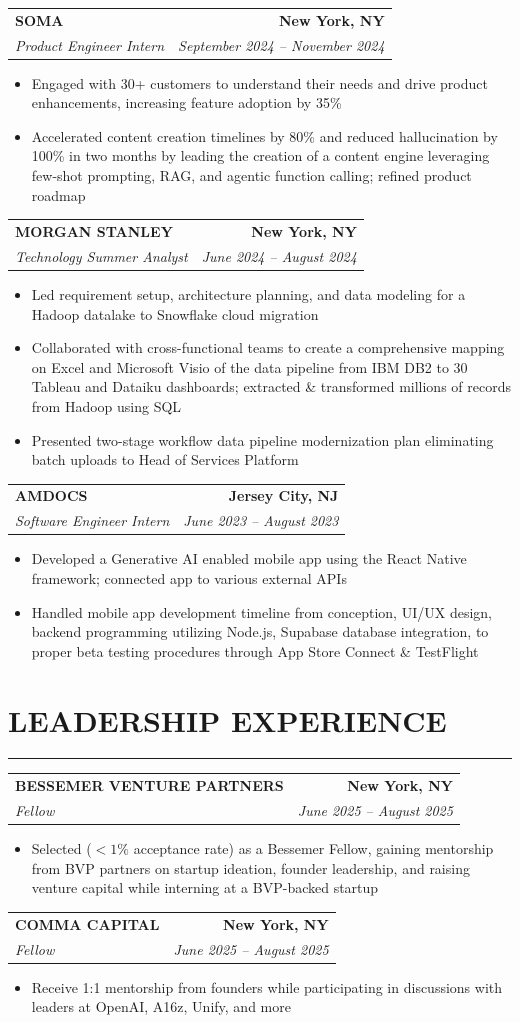 \documentclass[letterpaper,10pt]{article}
\makeatletter
\newcommand{\sectionline}{\vspace{1pt}\hrule\vspace{4pt}}
\newcommand{\resumeSubheading}[4]{%
  \vspace{2pt}
  \begin{tabular*}{\textwidth}{@{\extracolsep{\fill}} l r}
    \textbf{#1} & \textbf{#2} \\
    \textit{#3} & \textit{#4} \\
  \end{tabular*}
}
\newcommand{\resumeItem}[1]{\item #1}
\newcommand{\resumeItemListStart}{\begin{itemize}}
\newcommand{\resumeItemListEnd}{\end{itemize}}
\makeatother
\begin{document}
\resumeSubheading
  {SOMA}{New York, NY}
  {Product Engineer Intern}{September 2024 -- November 2024}
\resumeItemListStart
  \resumeItem{Engaged with 30+ customers to understand their needs and drive product enhancements, increasing feature adoption by 35\%}
  \resumeItem{Accelerated content creation timelines by 80\% and reduced hallucination by 100\% in two months by leading the creation of a content engine leveraging few-shot prompting, RAG, and agentic function calling; refined product roadmap}
\resumeItemListEnd

\resumeSubheading
  {MORGAN STANLEY}{New York, NY}
  {Technology Summer Analyst}{June 2024 -- August 2024}
\resumeItemListStart
  \resumeItem{Led requirement setup, architecture planning, and data modeling for a Hadoop datalake to Snowflake cloud migration}
  \resumeItem{Collaborated with cross-functional teams to create a comprehensive mapping on Excel and Microsoft Visio of the data pipeline from IBM DB2 to 30 Tableau and Dataiku dashboards; extracted \& transformed millions of records from Hadoop using SQL}
  \resumeItem{Presented two-stage workflow data pipeline modernization plan eliminating batch uploads to Head of Services Platform}
\resumeItemListEnd

\resumeSubheading
  {AMDOCS}{Jersey City, NJ}
  {Software Engineer Intern}{June 2023 -- August 2023}
\resumeItemListStart
  \resumeItem{Developed a Generative AI enabled mobile app using the React Native framework; connected app to various external APIs}
  \resumeItem{Handled mobile app development timeline from conception, UI/UX design, backend programming utilizing Node.js, Supabase database integration, to proper beta testing procedures through App Store Connect \& TestFlight}
\resumeItemListEnd

\section*{LEADERSHIP EXPERIENCE}
\sectionline
\resumeSubheading
  {BESSEMER VENTURE PARTNERS}{New York, NY}
  {Fellow}{June 2025 -- August 2025}
\resumeItemListStart
  \resumeItem{Selected ($<1\%$ acceptance rate) as a Bessemer Fellow, gaining mentorship from BVP partners on startup ideation, founder leadership, and raising venture capital while interning at a BVP-backed startup}
\resumeItemListEnd

\resumeSubheading
  {COMMA CAPITAL}{New York, NY}
  {Fellow}{June 2025 -- August 2025}
\resumeItemListStart
  \resumeItem{Receive 1:1 mentorship from founders while participating in discussions with leaders at OpenAI, A16z, Unify, and more}
\resumeItemListEnd
\end{document}
